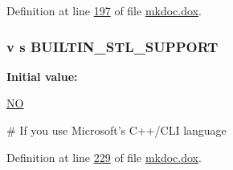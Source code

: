 Definition at line \hyperlink{mkdoc_8dox_source_l00197}{197} of file \hyperlink{mkdoc_8dox_source}{mkdoc.\-dox}.

\hypertarget{mkdoc_8dox_ab43c02f50185eae26e7fdfe802989f59}{
\subsubsection[{B\-U\-I\-L\-T\-I\-N\-\_\-\-S\-T\-L\-\_\-\-S\-U\-P\-P\-O\-R\-T}]{\setlength{\rightskip}{0pt plus 5cm}v s B\-U\-I\-L\-T\-I\-N\-\_\-\-S\-T\-L\-\_\-\-S\-U\-P\-P\-O\-R\-T}}\label{mkdoc_8dox_ab43c02f50185eae26e7fdfe802989f59}
{\bfseries Initial value\-:}
\begin{DoxyCode}
 \hyperlink{mkdoc_8dox_a0f6a46245280dc38baf9600906aa1393}{NO}

\textcolor{preprocessor}{# If you use Microsoft's C++/CLI language}
\end{DoxyCode}


Definition at line \hyperlink{mkdoc_8dox_source_l00229}{229} of file \hyperlink{mkdoc_8dox_source}{mkdoc.\-dox}.


